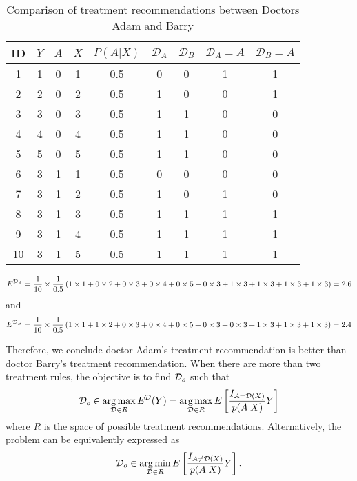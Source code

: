 \begin{table}[htbp]
\centering
\caption{Comparison of treatment recommendations between Doctors Adam and Barry}
\begin{tabular}{c|ccc|ccccc}
\hline \hline
ID & $Y$ & $A$ & $X$ & $P\left( {A|X} \right)$ &
$\mathcal{D}_A$ & $\mathcal{D}_B$ & $\mathcal{D}_A = A$ & $\mathcal{D}_B = A$
\\
\hline
1  & 1 & 0 & 1 & 0.5  & 0  & 0  & 1   & 1   \\
2  & 2 & 0 & 2 & 0.5  & 1  & 0  & 0   & 1   \\
3  & 3 & 0 & 3 & 0.5  & 1  & 1  & 0   & 0   \\
4  & 4 & 0 & 4 & 0.5  & 1  & 1  & 0   & 0   \\
5  & 5 & 0 & 5 & 0.5  & 1  & 1  & 0   & 0   \\
6  & 3 & 1 & 1 & 0.5  & 0  & 0  & 0   & 0   \\
7  & 3 & 1 & 2 & 0.5  & 1  & 0  & 1   & 0   \\
8  & 3 & 1 & 3 & 0.5  & 1  & 1  & 1   & 1   \\
9  & 3 & 1 & 4 & 0.5  & 1  & 1  & 1   & 1   \\
10 & 3 & 1 & 5 & 0.5  & 1  & 1  & 1   & 1   \\
\hline \hline
\end{tabular}
\end{table}

\[
E^{{\cal D}_A} = \frac{1}{10}\times \frac{1}{0.5}
\left (
1\times 1 + 0 \times 2 + 0 \times 3 + 0 \times 4 + 0 \times 5 +
0\times 3 + 1 \times 3 + 1 \times 3 + 1 \times 3 + 1 \times 3
\right) = 2.6
\]
and
\[
E^{{\cal D}_B} = \frac{1}{10}\times \frac{1}{0.5}
\left (
1\times 1 + 1 \times 2 + 0 \times 3 + 0 \times 4 + 0 \times 5 +
0\times 3 + 0 \times 3 + 1 \times 3 + 1 \times 3 + 1 \times 3
\right) = 2.4
\]

Therefore, we conclude doctor Adam's treatment recommendation is better than
doctor Barry's treatment recommendation. When there are more than two treatment
rules, the objective is to find  ${\cal D}_o$ such that
\begin{equation}
  \label{eq:max}
  {\cal D}_o \in \mathop {\arg \max} \limits_{{\cal D} \in R} E^{\cal D}(Y) =
  \mathop {\arg \max} \limits_{{\cal D} \in R}
  E\left [ \frac{I_{A={\cal D}(X)}}{p(A|X)} Y \right ]
\end{equation}
where $R$ is the space of possible treatment recommendations. Alternatively, the
problem can be equivalently expressed as
\begin{equation}
  \label{eq:min}
  {\cal D}_o \in \mathop {\arg \min} \limits_{{\cal D} \in R} E
  \left [ \frac{I_{A \neq {\cal D}(X)}}{p(A|X)} Y \right ].
\end{equation}
